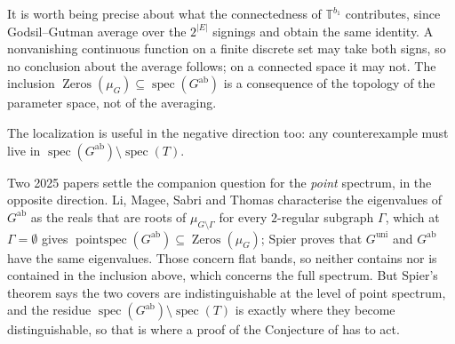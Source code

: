 \documentclass[11pt]{article}
\theoremstyle{remark}
\begin{document}
It is worth being precise about what the connectedness of $\mathbb T^{b_1}$ contributes,
since Godsil--Gutman average over the $2^{|E|}$ signings and obtain the same identity. A
nonvanishing continuous function on a finite discrete set may take both signs, so no
conclusion about the average follows; on a connected space it may not. The inclusion
$\operatorname{Zeros}(\mu_G)\subseteq\operatorname{spec}(G^{\mathrm{ab}})$ is a consequence of
the topology of the parameter space, not of the averaging.

The localization is useful in the negative direction too: any counterexample must live in
$\operatorname{spec}(G^{\mathrm{ab}})\setminus\operatorname{spec}(T)$.

Two 2025 papers settle the companion question for the \emph{point} spectrum, in the opposite
direction. Li, Magee, Sabri and Thomas \cite{LMST} characterise the eigenvalues of
$G^{\mathrm{ab}}$ as the reals that are roots of $\mu_{G\setminus\Gamma}$ for every
$2$-regular subgraph $\Gamma$, which at $\Gamma=\emptyset$ gives
$\operatorname{pointspec}(G^{\mathrm{ab}})\subseteq\operatorname{Zeros}(\mu_G)$; Spier
\cite{Sp} proves that $G^{\mathrm{uni}}$ and $G^{\mathrm{ab}}$ have the same eigenvalues.
Those concern flat bands, so neither contains nor is contained in the inclusion above, which
concerns the full spectrum. But Spier's theorem says the two covers are indistinguishable at
the level of point spectrum, and the residue
$\operatorname{spec}(G^{\mathrm{ab}})\setminus\operatorname{spec}(T)$ is exactly where they
become distinguishable, so that is where a proof of the Conjecture of \cite{PartI} has to act.
\end{document}
